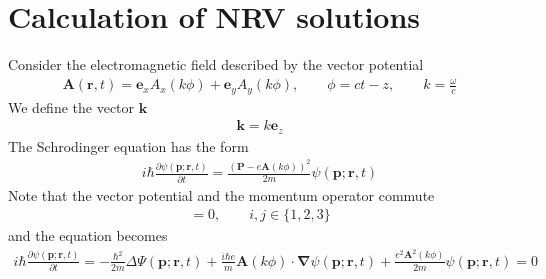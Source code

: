 
\chapter{Calculation of NRV solutions}

Consider the electromagnetic field described by the vector potential
\begin{align}
    {\bm A}({\bm r},t)= {\bm e}_x A_x(k\phi)+{\bm e}_y A_y(k\phi), \qquad \phi = c t-z,\qquad k=\frac{\omega}{c}
\end{align}
We define the vector ${\bm k}$
\begin{align}
    {\bm k}=k{\bm e}_z
\end{align}
The Schrodinger equation has the form
\begin{align}
    i\hbar\frac{\partial\psi({\bm p};{\bm r},t)}{\partial t}=\frac{({\bm P}-e{\bm A}(k\phi))^2}{2m}\psi({\bm p};{\bm r},t)
\end{align}
Note that the vector potential and the momentum operator commute
\begin{align}
    [P_i, A_j]=0,\qquad i,j\in\{1,2,3\}
\end{align}
and the equation becomes
\begin{align}
    i\hbar\frac{\partial \psi({\bm p};{\bm r},t)}{\partial t}=-\frac{\hbar^2}{2m}\Delta\Psi({\bm p};{\bm r},t)+\frac{i\hbar e}m {\bm A}(k\phi)\cdot{\boldsymbol{\nabla}}\psi({\bm p};{\bm r},t)+\frac{e^2{\bm A}^2(k\phi)}{2m}\psi({\bm p};{\bm r},t)=0
\end{align}

